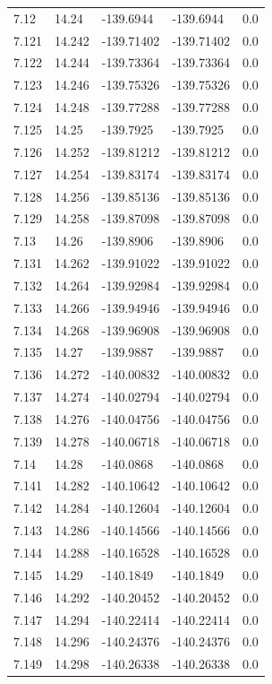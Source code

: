 \begin{tabular}{lllll}
7.12 & 14.24 & -139.6944 & -139.6944 & 0.0 \\
7.121 & 14.242 & -139.71402 & -139.71402 & 0.0 \\
7.122 & 14.244 & -139.73364 & -139.73364 & 0.0 \\
7.123 & 14.246 & -139.75326 & -139.75326 & 0.0 \\
7.124 & 14.248 & -139.77288 & -139.77288 & 0.0 \\
7.125 & 14.25 & -139.7925 & -139.7925 & 0.0 \\
7.126 & 14.252 & -139.81212 & -139.81212 & 0.0 \\
7.127 & 14.254 & -139.83174 & -139.83174 & 0.0 \\
7.128 & 14.256 & -139.85136 & -139.85136 & 0.0 \\
7.129 & 14.258 & -139.87098 & -139.87098 & 0.0 \\
7.13 & 14.26 & -139.8906 & -139.8906 & 0.0 \\
7.131 & 14.262 & -139.91022 & -139.91022 & 0.0 \\
7.132 & 14.264 & -139.92984 & -139.92984 & 0.0 \\
7.133 & 14.266 & -139.94946 & -139.94946 & 0.0 \\
7.134 & 14.268 & -139.96908 & -139.96908 & 0.0 \\
7.135 & 14.27 & -139.9887 & -139.9887 & 0.0 \\
7.136 & 14.272 & -140.00832 & -140.00832 & 0.0 \\
7.137 & 14.274 & -140.02794 & -140.02794 & 0.0 \\
7.138 & 14.276 & -140.04756 & -140.04756 & 0.0 \\
7.139 & 14.278 & -140.06718 & -140.06718 & 0.0 \\
7.14 & 14.28 & -140.0868 & -140.0868 & 0.0 \\
7.141 & 14.282 & -140.10642 & -140.10642 & 0.0 \\
7.142 & 14.284 & -140.12604 & -140.12604 & 0.0 \\
7.143 & 14.286 & -140.14566 & -140.14566 & 0.0 \\
7.144 & 14.288 & -140.16528 & -140.16528 & 0.0 \\
7.145 & 14.29 & -140.1849 & -140.1849 & 0.0 \\
7.146 & 14.292 & -140.20452 & -140.20452 & 0.0 \\
7.147 & 14.294 & -140.22414 & -140.22414 & 0.0 \\
7.148 & 14.296 & -140.24376 & -140.24376 & 0.0 \\
7.149 & 14.298 & -140.26338 & -140.26338 & 0.0 \\

\end{tabular}
